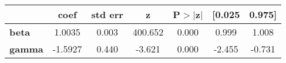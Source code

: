 \begin{center}
\begin{tabular}{lcccccc}
\toprule
               & \textbf{coef} & \textbf{std err} & \textbf{z} & \textbf{P$> |$z$|$} & \textbf{[0.025} & \textbf{0.975]}  \\
\midrule
\textbf{beta}  &       1.0035  &        0.003     &   400.652  &         0.000        &        0.999    &        1.008     \\
\textbf{gamma} &      -1.5927  &        0.440     &    -3.621  &         0.000        &       -2.455    &       -0.731     \\
\bottomrule
\end{tabular}
\end{center}